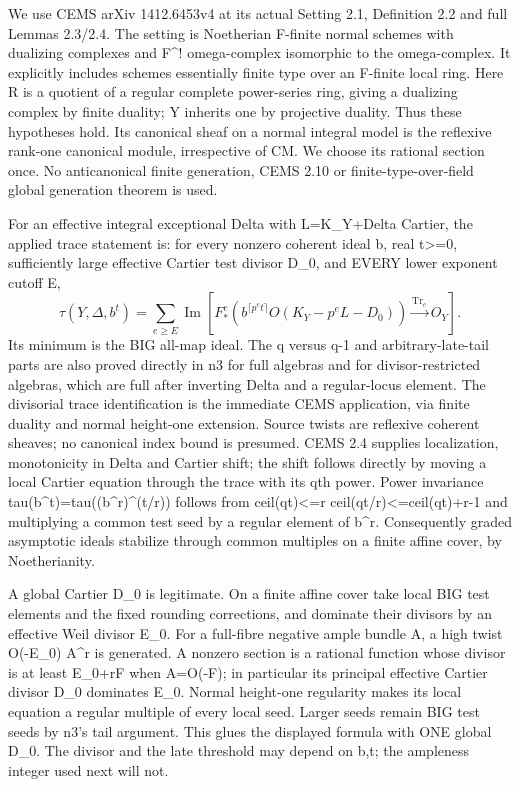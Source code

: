 \documentclass[11pt]{article}
\begin{document}
We use CEMS arXiv 1412.6453v4 at its actual Setting 2.1, Definition 2.2 and full Lemmas 2.3/2.4. The setting is Noetherian F-finite normal schemes with dualizing complexes and F\textasciicircum{}! omega-complex isomorphic to the omega-complex. It explicitly includes schemes essentially finite type over an F-finite local ring. Here R is a quotient of a regular complete power-series ring, giving a dualizing complex by finite duality; Y inherits one by projective duality. Thus these hypotheses hold. Its canonical sheaf on a normal integral model is the reflexive rank-one canonical module, irrespective of CM. We choose its rational section once. No anticanonical finite generation, CEMS 2.10 or finite-type-over-field global generation theorem is used.

For an effective integral exceptional Delta with L=K\_Y+Delta Cartier, the applied trace statement is: for every nonzero coherent ideal b, real t>=0, sufficiently large effective Cartier test divisor D\_0, and EVERY lower exponent cutoff E,
\[
\tau(Y,\Delta,b^t)=\sum_{e\ge E}
\operatorname{Im}\left[F_*^e(b^{\lceil p^e t\rceil}
 O(K_Y-p^e L-D_0))\xrightarrow{\operatorname{Tr}_e}O_Y\right].
\]
Its minimum is the BIG all-map ideal. The q versus q-1 and arbitrary-late-tail parts are also proved directly in n3 for full algebras and for divisor-restricted algebras, which are full after inverting Delta and a regular-locus element. The divisorial trace identification is the immediate CEMS application, via finite duality and normal height-one extension. Source twists are reflexive coherent sheaves; no canonical index bound is presumed. CEMS 2.4 supplies localization, monotonicity in Delta and Cartier shift; the shift follows directly by moving a local Cartier equation through the trace with its qth power. Power invariance tau(b\textasciicircum{}t)=tau((b\textasciicircum{}r)\textasciicircum{}(t/r)) follows from ceil(qt)<=r ceil(qt/r)<=ceil(qt)+r-1 and multiplying a common test seed by a regular element of b\textasciicircum{}r. Consequently graded asymptotic ideals stabilize through common multiples on a finite affine cover, by Noetherianity.

A global Cartier D\_0 is legitimate. On a finite affine cover take local BIG test elements and the fixed rounding corrections, and dominate their divisors by an effective Weil divisor E\_0. For a full-fibre negative ample bundle A, a high twist O(-E\_0) A\textasciicircum{}r is generated. A nonzero section is a rational function whose divisor is at least E\_0+rF when A=O(-F); in particular its principal effective Cartier divisor D\_0 dominates E\_0. Normal height-one regularity makes its local equation a regular multiple of every local seed. Larger seeds remain BIG test seeds by n3's tail argument. This glues the displayed formula with ONE global D\_0. The divisor and the late threshold may depend on b,t; the ampleness integer used next will not.
\end{document}
